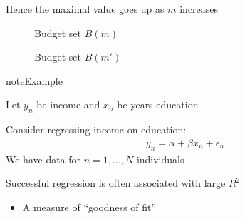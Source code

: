 \documentclass[letterpaper,10pt,english]{jupyterBook}
\begin{document}
\sphinxAtStartPar
Hence the maximal value goes up as \(m\) increases

\begin{figure}[htbp]
\centering
\capstart

\noindent{}
\caption{Budget set \(B(m)\)}\label{\detokenize{06.optimization_fundamentals:id4}}\end{figure}

\begin{figure}[htbp]
\centering
\capstart

\noindent{}
\caption{Budget set \(B(m')\)}\label{\detokenize{06.optimization_fundamentals:id5}}\end{figure}

\begin{sphinxadmonition}{note}{Example}

\sphinxAtStartPar
Let \(y_n\) be income and \(x_n\) be years education
\end{sphinxadmonition}

\sphinxAtStartPar
Consider regressing income on education:
\begin{equation*}
\begin{split}
%
y_n = \alpha + \beta x_n + \epsilon_n 
%
\end{split}
\end{equation*}
\sphinxAtStartPar
We have data for \(n = 1, \ldots, N\) individuals

\sphinxAtStartPar
Successful regression is often associated with large \(R^2\)
\begin{itemize}
\item {} 
\sphinxAtStartPar
A measure of “goodness of fit”

\end{itemize}
\end{document}
